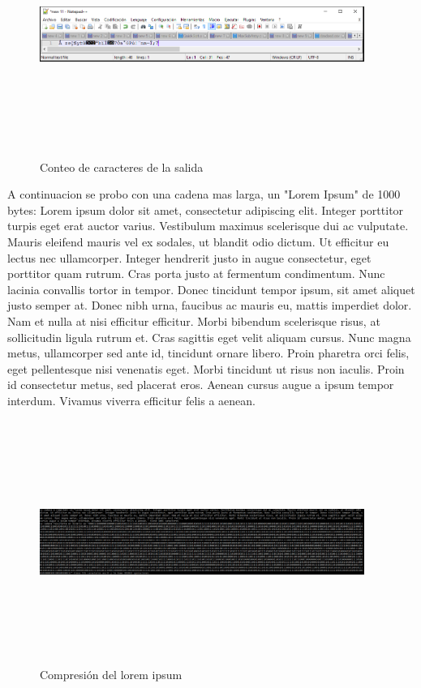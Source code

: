 \documentclass[spanish]{article}
\begin{document}
	\begin{figure}[H]
		\centering
		\includegraphics[width=400px,height=300px]{captura4}
		\caption{Conteo de caracteres de la salida}
	\end{figure}
	A continuacion se probo con una cadena mas larga, un "Lorem Ipsum" de 1000 bytes:
	Lorem ipsum dolor sit amet, consectetur adipiscing elit. Integer porttitor turpis eget erat auctor varius. Vestibulum maximus scelerisque dui ac vulputate. Mauris eleifend mauris vel ex sodales, ut blandit odio dictum. Ut efficitur eu lectus nec ullamcorper. Integer hendrerit justo in augue consectetur, eget porttitor quam rutrum. Cras porta justo at fermentum condimentum. Nunc lacinia convallis tortor in tempor. Donec tincidunt tempor ipsum, sit amet aliquet justo semper at. Donec nibh urna, faucibus ac mauris eu, mattis imperdiet dolor. Nam et nulla at nisi efficitur efficitur. Morbi bibendum scelerisque risus, at sollicitudin ligula rutrum et. Cras sagittis eget velit aliquam cursus.
	Nunc magna metus, ullamcorper sed ante id, tincidunt ornare libero. Proin pharetra orci felis, eget pellentesque nisi venenatis eget. Morbi tincidunt ut risus non iaculis. Proin id consectetur metus, sed placerat eros. Aenean cursus augue a ipsum tempor interdum. Vivamus viverra efficitur felis a aenean. 
	\begin{figure}[H]
		\centering
		\includegraphics[width=400px,height=300px]{captura5}
		\caption{Compresión del lorem ipsum}
	\end{figure}
	
\end{document}
